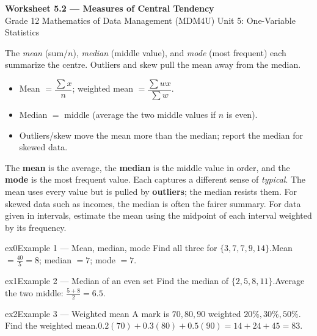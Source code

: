\documentclass[11pt]{article}
\begin{document}
\begin{center}
{\LARGE\bfseries\color{titleblue}Worksheet 5.2 --- Measures of Central Tendency}\\[2pt]
{\small Grade 12 Mathematics of Data Management (MDM4U) \textperiodcentered{} Unit 5: One-Variable Statistics}
\end{center}

\begin{ideabox}
The \emph{mean} (sum$/n$), \emph{median} (middle value), and \emph{mode} (most frequent) each summarize the centre. Outliers and skew pull the mean away from the median.
\begin{itemize}[leftmargin=*,itemsep=2pt]
  \item Mean $=\dfrac{\sum x}{n}$; weighted mean $=\dfrac{\sum w x}{\sum w}$.
  \item Median $=$ middle (average the two middle values if $n$ is even).
  \item Outliers/skew move the mean more than the median; report the median for skewed data.
\end{itemize}
\end{ideabox}

\begin{learnbox}
The \textbf{mean} is the average, the \textbf{median} is the middle value in order, and the \textbf{mode} is the most frequent value. Each captures a different sense of \emph{typical}.
The mean uses every value but is pulled by \textbf{outliers}; the median resists them. For skewed data such as incomes, the median is often the fairer summary.
For data given in intervals, estimate the mean using the midpoint of each interval weighted by its frequency.
\end{learnbox}


\begin{example}{ex0}{Example 1 --- Mean, median, mode}
Find all three for $\{3,7,7,9,14\}$.\soln Mean $=\tfrac{40}{5}=8$; median $=7$; mode $=7$.
\end{example}

\begin{example}{ex1}{Example 2 --- Median of an even set}
Find the median of $\{2,5,8,11\}$.\soln Average the two middle: $\tfrac{5+8}{2}=6.5$.
\end{example}

\begin{example}{ex2}{Example 3 --- Weighted mean}
A mark is $70,80,90$ weighted $20\%,30\%,50\%$. Find the weighted mean.\soln $0.2(70)+0.3(80)+0.5(90)=14+24+45=83$.
\end{example}
\end{document}
